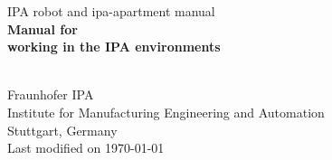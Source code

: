 %
%
\begin{titlepage}
\vspace*{13mm}
\begin{center}
  \vspace{10mm} 
         {\large \hspace{20mm} IPA robot and ipa-apartment manual\\}
  \vspace{10mm}
       {\Large
          \bf
          \hspace{20mm} Manual for\\}
  \vspace{5mm}
       {\Large
          \bf
          \hspace{20mm} working in the IPA environments\\}

  \vspace{80mm}
  \makebox[40mm]{}\\
  \vspace{10mm}
         {\large \hspace{20mm} Fraunhofer IPA} \\
  \vspace{5mm}
         {\large \hspace{20mm} Institute for Manufacturing Engineering and Automation} \\
         {\large \hspace{20mm} Stuttgart, Germany} \\
  \vfill
         {\large \hspace{20mm} Last modified on \today}
\end{center}
\end{titlepage}

\clearpage
\thispagestyle{empty}
\cleardoublepage